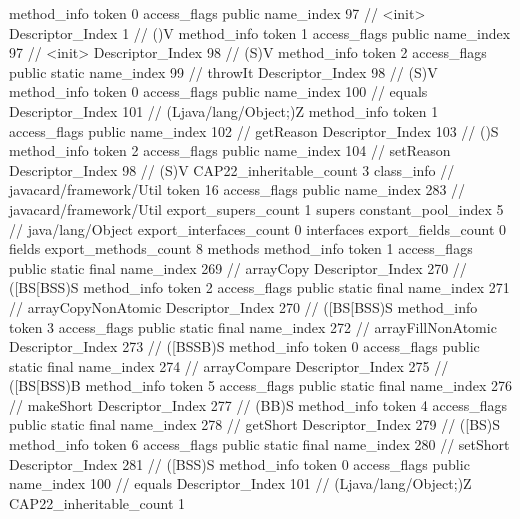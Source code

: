 {{{{				method_info {
					token	0
					access_flags	public
					name_index	97		// <init>
					Descriptor_Index	1		// ()V
				}
				method_info {
					token	1
					access_flags	public
					name_index	97		// <init>
					Descriptor_Index	98		// (S)V
				}
				method_info {
					token	2
					access_flags	public static
					name_index	99		// throwIt
					Descriptor_Index	98		// (S)V
				}
				method_info {
					token	0
					access_flags	public
					name_index	100		// equals
					Descriptor_Index	101		// (Ljava/lang/Object;)Z
				}
				method_info {
					token	1
					access_flags	public
					name_index	102		// getReason
					Descriptor_Index	103		// ()S
				}
				method_info {
					token	2
					access_flags	public
					name_index	104		// setReason
					Descriptor_Index	98		// (S)V
				}
			}
			CAP22_inheritable_count	3
		}
		class_info {		// javacard/framework/Util
			token	16
			access_flags	public
			name_index	283		// javacard/framework/Util
			export_supers_count	1
			supers {
				constant_pool_index	5		// java/lang/Object
			}
			export_interfaces_count	0
			interfaces {
			}
			export_fields_count	0
			fields {
			}
			export_methods_count	8
			methods {
				method_info {
					token	1
					access_flags	public static final
					name_index	269		// arrayCopy
					Descriptor_Index	270		// ([BS[BSS)S
				}
				method_info {
					token	2
					access_flags	public static final
					name_index	271		// arrayCopyNonAtomic
					Descriptor_Index	270		// ([BS[BSS)S
				}
				method_info {
					token	3
					access_flags	public static final
					name_index	272		// arrayFillNonAtomic
					Descriptor_Index	273		// ([BSSB)S
				}
				method_info {
					token	0
					access_flags	public static final
					name_index	274		// arrayCompare
					Descriptor_Index	275		// ([BS[BSS)B
				}
				method_info {
					token	5
					access_flags	public static final
					name_index	276		// makeShort
					Descriptor_Index	277		// (BB)S
				}
				method_info {
					token	4
					access_flags	public static final
					name_index	278		// getShort
					Descriptor_Index	279		// ([BS)S
				}
				method_info {
					token	6
					access_flags	public static final
					name_index	280		// setShort
					Descriptor_Index	281		// ([BSS)S
				}
				method_info {
					token	0
					access_flags	public
					name_index	100		// equals
					Descriptor_Index	101		// (Ljava/lang/Object;)Z
				}
			}
			CAP22_inheritable_count	1
		}
	}
}
